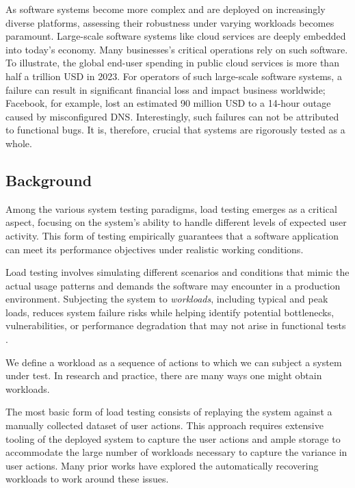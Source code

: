 As software systems become more complex and are deployed on increasingly diverse platforms, assessing their robustness under varying workloads becomes paramount. Large-scale software systems like cloud services are deeply embedded into today's economy. Many businesses's critical operations rely on such software. To illustrate, the global end-user spending in public cloud services is more than half a trillion USD in 2023\cite{UnknownUnknown-aj}. For operators of such large-scale software systems, a failure can result in significant financial loss and impact business worldwide\cite{LuuUnknown-mo}; Facebook, for example, lost an estimated 90 million USD to a 14-hour outage caused by misconfigured DNS\cite{AtlassianUnknown-sw}. Interestingly, such failures can not be attributed to functional bugs\cite{Weyuker2000-gw}. It is, therefore, crucial that systems are rigorously tested as a whole.

\subsection{Background}

Among the various system testing paradigms, load testing emerges as a critical aspect, focusing on the system's ability to handle different levels of expected user activity. This form of testing empirically guarantees that a software application can meet its performance objectives under realistic working conditions.

Load testing involves simulating different scenarios and conditions that mimic the actual usage patterns and demands the software may encounter in a production environment. Subjecting the system to \emph{workloads}, including typical and peak loads, reduces system failure risks while helping identify potential bottlenecks, vulnerabilities, or performance degradation that may not arise in functional tests \cite{Syer2017-ek, Shang2015-gj, Cohen2005-mn, Hassan2008-nj, Chen2016-bo}.

We define a workload as a sequence of actions to which we can subject a system under test. In research and practice, there are many ways one might obtain workloads.

The most basic form of load testing consists of replaying the system against a manually collected dataset of user actions. This approach requires extensive tooling of the deployed system to capture the user actions and ample storage to accommodate the large number of workloads necessary to capture the variance in user actions. Many prior works have explored the automatically recovering workloads to work around these issues.

